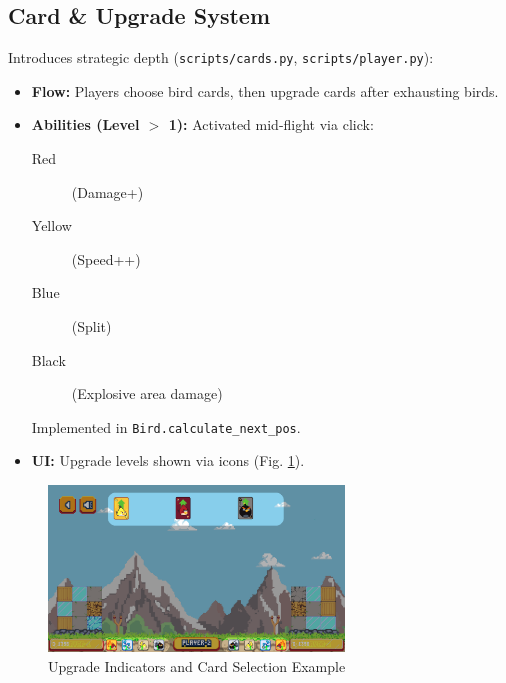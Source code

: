 \documentclass[11pt, a4paper]{article}
\begin{document}
\subsection{Card \& Upgrade System}

Introduces strategic depth (\texttt{scripts/cards.py}, \texttt{scripts/player.py}):

\begin{itemize}

    \item \textbf{Flow:} Players choose bird cards, then upgrade cards after exhausting birds.
    
    \item \textbf{Abilities (Level $>$ 1):} Activated mid-flight via click: 
    
    \begin{description}
    
        \item[Red] (Damage+)
        
        \item[Yellow] (Speed++)
        
        \item[Blue] (Split)
        
        \item[Black] (Explosive area damage)
    
    \end{description}
    
    Implemented in \texttt{Bird.calculate\_next\_pos}.
    
    \item \textbf{UI:} Upgrade levels shown via icons (Fig. \ref{fig:upgrades_a}).

\end{itemize}


\begin{figure}[h!]

    \centering
    
    \includegraphics[width=0.7\textwidth]{images/upgrade.png}
    
    \caption{Upgrade Indicators and Card Selection Example}
    
    \label{fig:upgrades_a}

\end{figure}
\end{document}
